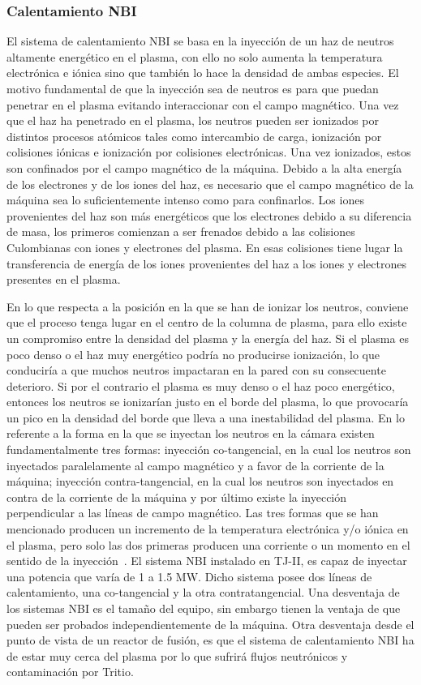 \subsubsection*{Calentamiento NBI}
El sistema de calentamiento NBI se basa en la inyección de un haz de neutros altamente
energético en el plasma, con ello no solo aumenta la temperatura electrónica e iónica sino que
también lo hace la densidad de ambas especies. El motivo fundamental de que la inyección
sea de neutros es para que puedan penetrar en el plasma evitando interaccionar con el campo
magnético.
Una vez que el haz ha penetrado en el plasma, los neutros pueden ser ionizados por distintos
procesos atómicos tales como intercambio de carga, ionización por colisiones iónicas e
ionización por colisiones electrónicas. Una vez ionizados, estos son confinados por el campo
magnético de la máquina. Debido a la alta energía de los electrones y de los iones del haz,
es necesario que el campo magnético de la máquina sea lo suficientemente intenso como para
confinarlos.
Los iones provenientes del haz son más energéticos que los electrones debido a su diferencia de
masa, los primeros comienzan a ser frenados debido a las colisiones Culombianas con iones
y electrones del plasma. En esas colisiones tiene lugar la transferencia de energía de los iones
provenientes del haz a los iones y electrones presentes en el plasma.\par
En lo que respecta a la posición en la que se han de ionizar los neutros, conviene que el
proceso tenga lugar en el centro de la columna de plasma, para ello existe un compromiso
entre la densidad del plasma y la energía del haz. Si el plasma es poco denso o el haz muy
energético podría no producirse ionización, lo que conduciría a que muchos neutros impactaran
en la pared con su consecuente deterioro. Si por el contrario el plasma es muy denso
o el haz poco energético, entonces los neutros se ionizarían justo en el borde del plasma, lo
que provocaría un pico en la densidad del borde que lleva a una inestabilidad del plasma.
En lo referente a la forma en la que se inyectan los neutros en la cámara existen fundamentalmente
tres formas: inyección co-tangencial, en la cual los neutros son inyectados paralelamente
al campo magnético y a favor de la corriente de la máquina; inyección contra-tangencial, en
la cual los neutros son inyectados en contra de la corriente de la máquina y por último existe
la inyección perpendicular a las líneas de campo magnético. Las tres formas que se han mencionado
producen un incremento de la temperatura electrónica y/o iónica en el plasma, pero
solo las dos primeras producen una corriente o un momento en el sentido de la inyección~\cite{wesson2004tokamaks}.
El sistema NBI instalado en TJ-II, es capaz de inyectar una potencia que varía de 1 a 1.5
MW. Dicho sistema posee dos líneas de calentamiento, una co-tangencial y la otra contratangencial.
Una desventaja de los sistemas NBI es el tamaño del equipo, sin embargo tienen la ventaja
de que pueden ser probados independientemente de la máquina. Otra desventaja desde el
punto de vista de un reactor de fusión, es que el sistema de calentamiento NBI ha de estar
muy cerca del plasma por lo que sufrirá flujos neutrónicos y contaminación por Tritio.
